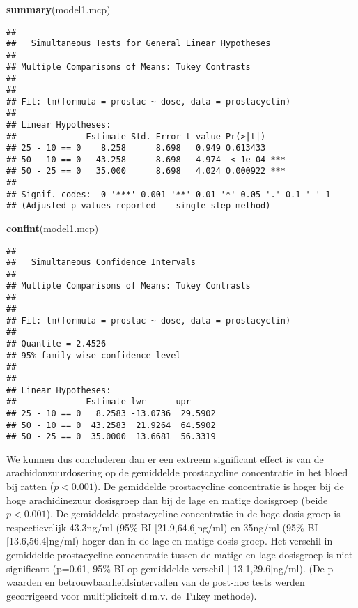 \documentclass[
  12pt,dutch,coursenotes]{book}
\newenvironment{Shaded}{\begin{snugshade}}{\end{snugshade}}
\newcommand{\KeywordTok}[1]{\textcolor[rgb]{0.13,0.29,0.53}{\textbf{#1}}}
\newcommand{\NormalTok}[1]{#1}
\theoremstyle{definition}
\theoremstyle{definition}
\theoremstyle{definition}
\theoremstyle{remark}
\begin{document}
\begin{Shaded}
\begin{Highlighting}[]
\KeywordTok{summary}\NormalTok{(model1.mcp)}
\end{Highlighting}
\end{Shaded}

\begin{verbatim}
## 
##   Simultaneous Tests for General Linear Hypotheses
## 
## Multiple Comparisons of Means: Tukey Contrasts
## 
## 
## Fit: lm(formula = prostac ~ dose, data = prostacyclin)
## 
## Linear Hypotheses:
##              Estimate Std. Error t value Pr(>|t|)    
## 25 - 10 == 0    8.258      8.698   0.949 0.613433    
## 50 - 10 == 0   43.258      8.698   4.974  < 1e-04 ***
## 50 - 25 == 0   35.000      8.698   4.024 0.000922 ***
## ---
## Signif. codes:  0 '***' 0.001 '**' 0.01 '*' 0.05 '.' 0.1 ' ' 1
## (Adjusted p values reported -- single-step method)
\end{verbatim}

\begin{Shaded}
\begin{Highlighting}[]
\KeywordTok{confint}\NormalTok{(model1.mcp)}
\end{Highlighting}
\end{Shaded}

\begin{verbatim}
## 
##   Simultaneous Confidence Intervals
## 
## Multiple Comparisons of Means: Tukey Contrasts
## 
## 
## Fit: lm(formula = prostac ~ dose, data = prostacyclin)
## 
## Quantile = 2.4526
## 95% family-wise confidence level
##  
## 
## Linear Hypotheses:
##              Estimate lwr      upr     
## 25 - 10 == 0   8.2583 -13.0736  29.5902
## 50 - 10 == 0  43.2583  21.9264  64.5902
## 50 - 25 == 0  35.0000  13.6681  56.3319
\end{verbatim}

We kunnen dus concluderen dan er een extreem significant effect is van de arachidonzuurdosering op de gemiddelde prostacycline concentratie in het bloed bij ratten (\(p<0.001\)).
De gemiddelde prostacycline concentratie is hoger bij de hoge arachidinezuur dosisgroep dan bij de lage en matige dosisgroep (beide \(p<0.001\)).
De gemiddelde prostacycline concentratie in de hoge dosis groep is respectievelijk 43.3ng/ml (95\% BI {[}21.9,64.6{]}ng/ml) en 35ng/ml (95\% BI {[}13.6,56.4{]}ng/ml) hoger dan in de lage en matige dosis groep.
Het verschil in gemiddelde prostacycline concentratie tussen de matige en lage dosisgroep is niet significant (p=0.61, 95\% BI op gemiddelde verschil {[}-13.1,29.6{]}ng/ml).
(De p-waarden en betrouwbaarheidsintervallen van de post-hoc tests werden gecorrigeerd voor multipliciteit d.m.v. de Tukey methode).
\end{document}
